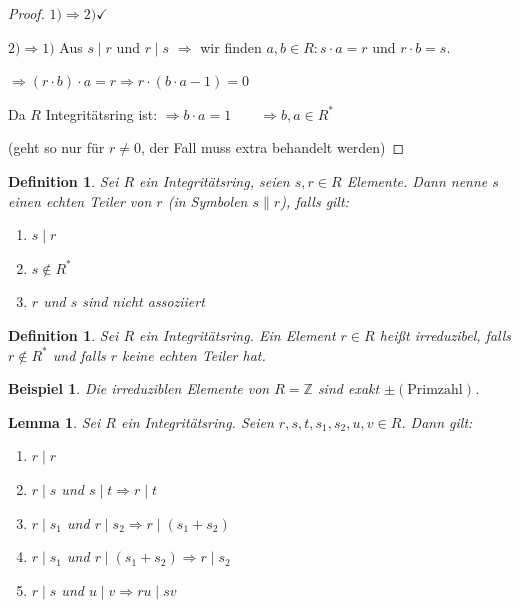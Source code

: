\documentclass[a4paper,12pt,numbers=noenddot,parskip=full]{scrartcl}
\newcommand{\setZ}{\mathbb{Z}}
\theoremstyle{dotless}
\newtheorem{lemma}[theorem]{Lemma}
\newtheorem{definition}[theorem]{Definition}
\newtheorem{example}[theorem]{Beispiel}
\theoremstyle{remark}
\begin{document}
 	\begin{proof}
 		$1) \Rightarrow 2) \checkmark$
 		
 		$2) \Rightarrow 1)$ Aus $s \mid r$ und $r \mid s$ $\Rightarrow$ wir finden $a,b \in R: s \cdot a = r$ und $r \cdot b = s$.
 		
 		$\Rightarrow (r \cdot b) \cdot a = r \Rightarrow r \cdot (b \cdot a - 1) = 0$
 		
 		Da $R$ Integritätsring ist: $\Rightarrow b \cdot a = 1 \qquad \Rightarrow b,a \in R^*$
 		
 		(geht so nur für $r \neq 0$, der Fall muss extra behandelt werden)
 	\end{proof}
 
 	\begin{definition}
 		Sei $R$ ein Integritätsring, seien $s,r \in R$ Elemente. Dann nenne $s$ einen \emph{echten Teiler} von $r$ (in Symbolen $s \parallel r$), falls gilt:
 		\begin{enumerate}
 			\item $s \mid r$
 			\item $s \notin R^*$
 			\item $r$ und $s$ sind nicht assoziiert
 		\end{enumerate}
 	\end{definition}
 
 	\begin{definition}
 		Sei $R$ ein Integritätsring. Ein Element $r \in R$ heißt \emph{irreduzibel}, falls $r \notin R^*$ und falls $r$ keine echten Teiler hat.
 	\end{definition}
 
 	\begin{example}
 		Die irreduziblen Elemente von $R = \setZ$ sind exakt $\pm(\text{Primzahl})$.
 	\end{example}
 
 	\begin{lemma}
 		Sei $R$ ein Integritätsring. Seien $r, s, t, s_1, s_2, u, v \in R$. Dann gilt:
 		\begin{enumerate}
 			\item $r \mid r$
 			\item $r \mid s$ und $s \mid t \Rightarrow r \mid t$
 			\item $r \mid s_1$ und $r \mid s_2 \Rightarrow r \mid (s_1 + s_2)$
 			\item $r \mid s_1$ und $r \mid (s_1 + s_2) \Rightarrow r \mid s_2$
 			\item $r \mid s$ und $u \mid v \Rightarrow ru \mid sv$
 		\end{enumerate}
 	\end{lemma}
 
\end{document}
